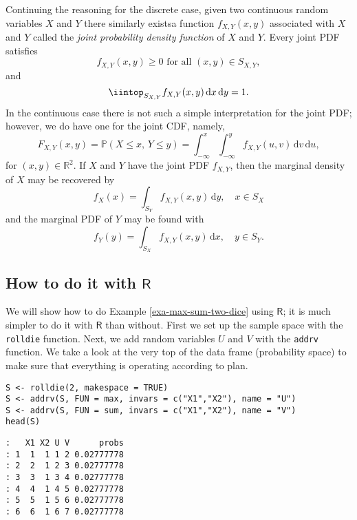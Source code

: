Continuing the reasoning for the discrete case, given two continuous
random variables \(X\) and \(Y\) there similarly
existsa function \(f_{X,Y}(x,y)\) associated with
\(X\) and \(Y\) called the \emph{joint probability density function} of
\(X\) and \(Y\). Every joint PDF satisfies
\begin{equation}
f_{X,Y}(x,y)\geq0\mbox{ for all }(x,y)\in S_{X,Y},
\end{equation}
and
\begin{equation}
\iintop_{S_{X,Y}}f_{X,Y}(x,y)\,\mathrm{d} x\,\mathrm{d} y=1.
\end{equation}
In the continuous case there is not such a simple interpretation for
the joint PDF; however, we do have one for the joint CDF, namely, \[
F_{X,Y}(x,y)=\mathbb{P}(X\leq x,\, Y\leq
y)=\int_{-\infty}^{x}\int_{-\infty}^{y}f_{X,Y}(u,v)\,\mathrm{d}
v\,\mathrm{d} u, \] for \((x,y)\in\mathbb{R}^{2}\). If \(X\) and \(Y\)
have the joint PDF \(f_{X,Y}\), then the marginal density of \(X\) may
be recovered by
\begin{equation}
f_{X}(x)=\int_{S_{Y}}f_{X,Y}(x,y)\,\mathrm{d} y,\quad x \in S_{X}
\end{equation}
and the marginal PDF of \(Y\) may be found with
\begin{equation}
f_{Y}(y)=\int_{S_{X}}f_{X,Y}(x,y)\,\mathrm{d} x, \quad y \in S_{Y}.
\end{equation}

\subsection{How to do it with \(\mathsf{R}\)}
\label{sec-7-1-1}

We will show how to do Example \ref{exa-max-sum-two-dice} using \(\mathsf{R}\);
it is much simpler to do it with \(\mathsf{R}\) than without. First we
set up the sample space with the \texttt{rolldie} function. Next, we add
random variables \(U\) and \(V\) with the \texttt{addrv} function. We take a
look at the very top of the data frame (probability space) to make
sure that everything is operating according to plan.

\begin{verbatim}
S <- rolldie(2, makespace = TRUE)
S <- addrv(S, FUN = max, invars = c("X1","X2"), name = "U")
S <- addrv(S, FUN = sum, invars = c("X1","X2"), name = "V")
head(S)
\end{verbatim}

\begin{verbatim}
:   X1 X2 U V      probs
: 1  1  1 1 2 0.02777778
: 2  2  1 2 3 0.02777778
: 3  3  1 3 4 0.02777778
: 4  4  1 4 5 0.02777778
: 5  5  1 5 6 0.02777778
: 6  6  1 6 7 0.02777778
\end{verbatim}

